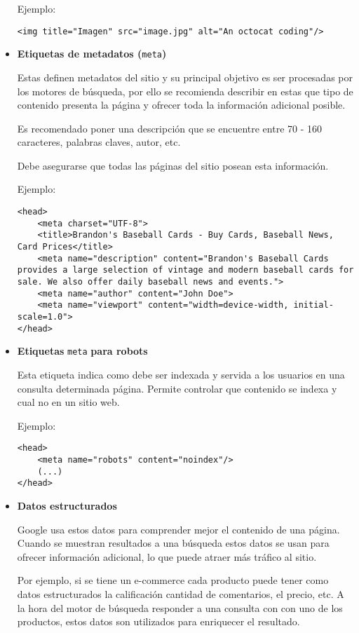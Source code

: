 \documentclass[12pt]{article}
\begin{document}
\begin{itemize}
Ejemplo:
\begin{lstlisting}
<img title="Imagen" src="image.jpg" alt="An octocat coding"/>    
\end{lstlisting}

\item \textbf{Etiquetas de metadatos (}\verb+meta+\textbf{)}

Estas definen metadatos del sitio y su principal objetivo es ser procesadas por los motores de búsqueda, por ello se recomienda describir en estas que tipo de contenido presenta la página y ofrecer toda la información adicional posible.

Es recomendado poner una descripción que se encuentre entre 70 - 160 caracteres, palabras claves, autor, etc.

Debe asegurarse que todas las páginas del sitio posean esta información.

Ejemplo:
\begin{lstlisting}
<head>
    <meta charset="UTF-8">
    <title>Brandon's Baseball Cards - Buy Cards, Baseball News, Card Prices</title>
    <meta name="description" content="Brandon's Baseball Cards provides a large selection of vintage and modern baseball cards for sale. We also offer daily baseball news and events.">
    <meta name="author" content="John Doe">
    <meta name="viewport" content="width=device-width, initial-scale=1.0">
</head>
\end{lstlisting}

\item \textbf{Etiquetas} \verb+meta+  \textbf{para robots} \cite{meta_robots}

Esta etiqueta indica como debe ser indexada y servida a los usuarios en una consulta determinada página. Permite controlar que contenido se indexa y cual no en un sitio web.

Ejemplo:
\begin{lstlisting}
<head>
    <meta name="robots" content="noindex"/>
    (...)
</head>
\end{lstlisting}

\item \textbf{Datos estructurados} \cite{rich_results}

Google usa estos datos para comprender mejor el contenido de una página. Cuando se muestran resultados a una búsqueda estos datos se usan para ofrecer información adicional, lo que puede atraer más tráfico al sitio.

Por ejemplo, si se tiene un e-commerce cada producto puede tener como datos estructurados la calificación cantidad de comentarios, el precio, etc. A la hora del motor de búsqueda responder a una consulta con con uno de los productos, estos datos son utilizados para enriquecer el resultado.


\end{itemize}
\end{document}
